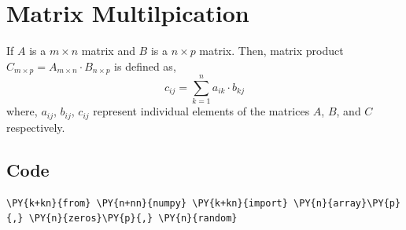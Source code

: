     
    
    

    
    \hypertarget{matrix-multilpication}{%
\section{Matrix Multilpication}\label{matrix-multilpication}}

    If \(A\) is a \(m \times n\) matrix and \(B\) is a \(n \times p\)
matrix. Then, matrix product
\(C_{m \times p} = A_{m \times n} \cdot B_{n \times p}\) is defined as,
\[c_{ij} = \sum_{k=1}^n a_{ik} \cdot b_{kj}\] where, \(a_{ij}\),
\(b_{ij}\), \(c_{ij}\) represent individual elements of the matrices
\(A\), \(B\), and \(C\) respectively.

    \hypertarget{code}{%
\subsection{Code}\label{code}}

    \begin{tcolorbox}[breakable, size=fbox, boxrule=1pt, pad at break*=1mm,colback=cellbackground, colframe=cellborder]
\begin{Verbatim}[commandchars=\\\{\}]
\PY{k+kn}{from} \PY{n+nn}{numpy} \PY{k+kn}{import} \PY{n}{array}\PY{p}{,} \PY{n}{zeros}\PY{p}{,} \PY{n}{random}
\end{Verbatim}
\end{tcolorbox}

